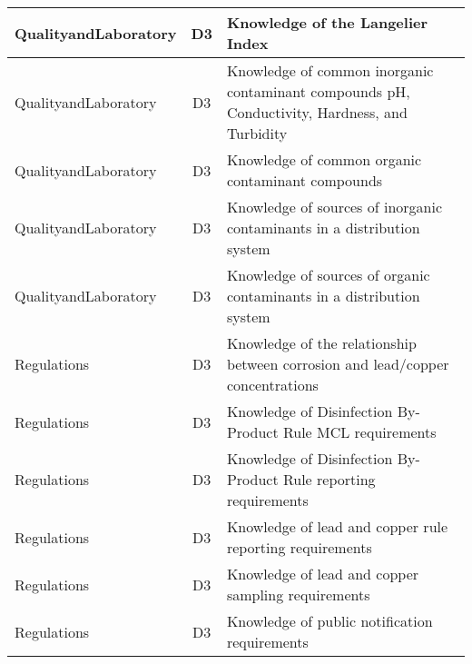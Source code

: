 \documentclass{article}
\begin{document}
\begin{table}[]
\begin{tabular}{|l|c|l|}
QualityandLaboratory                   & D3             & Knowledge of the   Langelier Index                                                                                                \\ \hline
QualityandLaboratory                   & D3             & Knowledge of common   inorganic contaminant compounds pH, Conductivity, Hardness, and Turbidity                                   \\ \hline
QualityandLaboratory                   & D3             & Knowledge of common   organic contaminant compounds                                                                               \\ \hline
QualityandLaboratory                   & D3             & Knowledge of sources   of inorganic contaminants in a distribution system                                                         \\ \hline
QualityandLaboratory                   & D3             & Knowledge of sources   of organic contaminants in a distribution system                                                           \\ \hline
Regulations                            & D3             & Knowledge of the   relationship between corrosion and lead/copper concentrations                                                  \\ \hline
Regulations                            & D3             & Knowledge of   Disinfection By-Product Rule MCL requirements                                                                      \\ \hline
Regulations                            & D3             & Knowledge of   Disinfection By-Product Rule reporting requirements                                                                \\ \hline
Regulations                            & D3             & Knowledge of lead and   copper rule reporting requirements                                                                        \\ \hline
Regulations                            & D3             & Knowledge of lead and   copper sampling requirements                                                                              \\ \hline
Regulations                            & D3             & Knowledge of public   notification requirements                                                                                   \\ \hline

\end{tabular}
\end{table}
\end{document}
